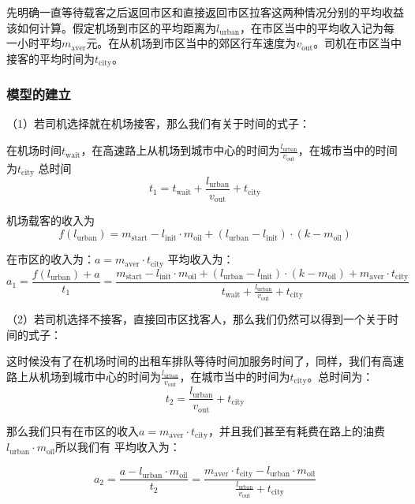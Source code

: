 \documentclass{cumcmthesis}
\begin{document}
先明确一直等待载客之后返回市区和直接返回市区拉客这两种情况分别的平均收益该如何计算。假定机场到市区的平均距离为$l_{\mathrm{urban}}$，在市区当中的平均收入记为每一小时平均$m_{\mathrm{aver}}$元。在从机场到市区当中的郊区行车速度为$v_{\mathrm{out}}$。司机在市区当中接客的平均时间为$t_{\mathrm{city}}$。
\par
\subsubsection{模型的建立}
（1）若司机选择就在机场接客，那么我们有关于时间的式子：\par
在机场时间$t_{ \mathrm{wait}}$，在高速路上从机场到城市中心的时间为$\frac{l_{\mathrm{urban}}}{v_{\mathrm{out}}}$，在城市当中的时间为$t_{\mathrm{city}} $ 总时间
$$t_{1} =t_{ \mathrm{wait}}+\frac{l_{\mathrm{urban}}}{v_{\mathrm{out}}}+t_{\mathrm{city}} $$\par
机场载客的收入为
$$f(l_{\mathrm{urban}}) = m_{\mathrm{start}}-l_{\mathrm{init}}\cdot m_{\mathrm{oil}}+(l_{\mathrm{urban}}-l_{\mathrm{init}})\cdot (k-m_{\mathrm{oil}}) $$\par
在市区的收入为：$a = m_{\mathrm{aver}}\cdot t_{\mathrm{city}}$
平均收入为：
$$a_{1}=\frac{f(l_{\mathrm{urban}})+a}{t_1}  = \frac{m_{\mathrm{start}}-l_{\mathrm{init}}\cdot m_{\mathrm{oil}}+(l_{\mathrm{urban}}-l_{\mathrm{init}})\cdot (k-m_{\mathrm{oil}})+ m_{\mathrm{aver}}\cdot t_{\mathrm{city}}}{t_{ \mathrm{wait}}+\frac{l_{\mathrm{urban}}}{v_{\mathrm{out}}}+t_{\mathrm{city}}} $$\par

\par \par
（2）若司机选择不接客，直接回市区找客人，那么我们仍然可以得到一个关于时间的式子：\par
这时候没有了在机场时间的出租车排队等待时间加服务时间了，同样，我们有高速路上从机场到城市中心的时间为$\frac{l_{\mathrm{urban}}}{v_{\mathrm{out}}}$，在城市当中的时间为$t_{\mathrm{city}} $。总时间为：
$$ t_{2} = \frac{l_{\mathrm{urban}}}{v_{\mathrm{out}}}+t_{\mathrm{city}} $$\par
那么我们只有在市区的收入$a = m_{\mathrm{aver}}\cdot t_{\mathrm{city}}$，并且我们甚至有耗费在路上的油费$l_{\mathrm{urban}}\cdot m_{\mathrm{oil}} $所以我们有 平均收入为：\par
$$
	a_2=\frac{a-l_{\mathrm{urban}}\cdot m_{\mathrm{oil}}}{t_{2}}=\frac{m_{\mathrm{aver}}\cdot t_{\mathrm{city}}-l_{\mathrm{urban}}\cdot m_{\mathrm{oil}}}{\frac{l_{\mathrm{urban}}}{v_{\mathrm{out}}}+t_{\mathrm{city}} }
$$\par
\end{document}
